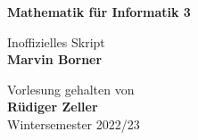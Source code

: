 \begin{titlepage}
	\begin{center}
		\vspace*{1cm}

		{\huge\textbf{Mathematik für Informatik 3}}

		\vspace{0.5cm}
		{\Large Inoffizielles Skript}\\
		\textbf{Marvin Borner}

		\vfill

		Vorlesung gehalten von\\
		\textbf{Rüdiger Zeller}\\
		Wintersemester 2022/23
	\end{center}
\end{titlepage}

